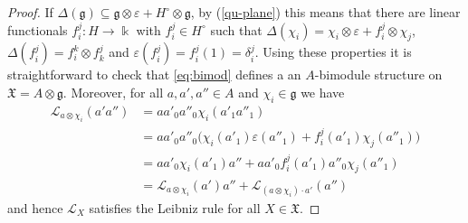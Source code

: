 \documentclass{article}
\theoremstyle{definition}
\newcommand{\Chi}{{\mathfrak{X}}}
\begin{document}
\begin{proof}
	
	If $\Delta(\mathfrak{g})\subseteq \mathfrak{g}\otimes\varepsilon+H^\circ\otimes\mathfrak{g}$,
	by (\ref{qu-plane})
	this means that there are linear functionals $f_i^j\colon H\to\Bbbk$ with $f_i^j\in H^\circ$
	such that
	$\Delta(\chi_i)=\chi_i\otimes\varepsilon+f_i^j\otimes\chi_j$, $\Delta(f_i^j)=f_i^k\otimes f_k^j$ and $\varepsilon(f_i^j)=f_i^j(1)=\delta_i^j$. 
	Using these properties it is straightforward to check that \eqref{eq:bimod} defines a an $A$-bimodule structure on $\mathfrak{X}=A\otimes\mathfrak{g}$.
	Moreover, for all $a,a',a''\in A$ and $\chi_i\in\mathfrak{g}$ we have
	\begin{align*}
		\mathscr{L}_{a\otimes\chi_i}(a'a'')
		&=aa'_0a''_0\chi_i(a'_1a''_1)\\
		&=aa'_0a''_0\big(\chi_i(a'_1)\varepsilon(a''_1)+f_i^j(a'_1)\chi_j(a''_1)\big)\\
		&=aa'_0\chi_i(a'_1)a''+aa'_0f_i^j(a'_1)a''_0\chi_j(a''_1)\\
		&=\mathscr{L}_{a\otimes\chi_i}(a')a''
		+\mathscr{L}_{(a\otimes\chi_i)\cdot a'}(a'')
	\end{align*}
	and hence $\mathscr{L}_X$ satisfies the Leibniz rule for all $X \in \Chi$.
	

\end{proof}
\end{document}
